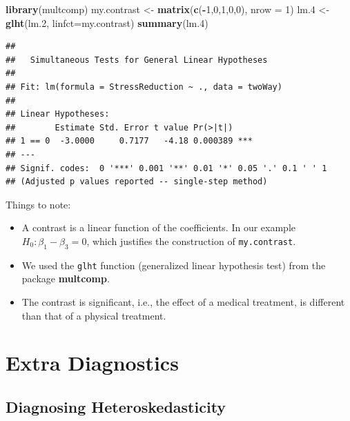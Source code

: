 \documentclass[]{book}
\newenvironment{Shaded}{\begin{snugshade}}{\end{snugshade}}
\newcommand{\KeywordTok}[1]{\textcolor[rgb]{0.13,0.29,0.53}{\textbf{#1}}}
\newcommand{\DataTypeTok}[1]{\textcolor[rgb]{0.13,0.29,0.53}{#1}}
\newcommand{\DecValTok}[1]{\textcolor[rgb]{0.00,0.00,0.81}{#1}}
\newcommand{\StringTok}[1]{\textcolor[rgb]{0.31,0.60,0.02}{#1}}
\newcommand{\OperatorTok}[1]{\textcolor[rgb]{0.81,0.36,0.00}{\textbf{#1}}}
\newcommand{\NormalTok}[1]{#1}
\providecommand{\tightlist}{%
  \setlength{\itemsep}{0pt}\setlength{\parskip}{0pt}}
\theoremstyle{definition}
\theoremstyle{definition}
\theoremstyle{definition}
\theoremstyle{remark}
\begin{document}
\begin{Shaded}
\begin{Highlighting}[]
\KeywordTok{library}\NormalTok{(multcomp)}
\NormalTok{my.contrast <-}\StringTok{ }\KeywordTok{matrix}\NormalTok{(}\KeywordTok{c}\NormalTok{(}\OperatorTok{-}\DecValTok{1}\NormalTok{,}\DecValTok{0}\NormalTok{,}\DecValTok{1}\NormalTok{,}\DecValTok{0}\NormalTok{,}\DecValTok{0}\NormalTok{), }\DataTypeTok{nrow =}  \DecValTok{1}\NormalTok{)}
\NormalTok{lm.}\DecValTok{4}\NormalTok{ <-}\StringTok{ }\KeywordTok{glht}\NormalTok{(lm.}\DecValTok{2}\NormalTok{, }\DataTypeTok{linfct=}\NormalTok{my.contrast)}
\KeywordTok{summary}\NormalTok{(lm.}\DecValTok{4}\NormalTok{)}
\end{Highlighting}
\end{Shaded}

\begin{verbatim}
## 
##   Simultaneous Tests for General Linear Hypotheses
## 
## Fit: lm(formula = StressReduction ~ ., data = twoWay)
## 
## Linear Hypotheses:
##        Estimate Std. Error t value Pr(>|t|)    
## 1 == 0  -3.0000     0.7177   -4.18 0.000389 ***
## ---
## Signif. codes:  0 '***' 0.001 '**' 0.01 '*' 0.05 '.' 0.1 ' ' 1
## (Adjusted p values reported -- single-step method)
\end{verbatim}

Things to note:

\begin{itemize}
\tightlist
\item
  A contrast is a linear function of the coefficients. In our example
  \(H_0:\beta_1-\beta_3=0\), which justifies the construction of
  \texttt{my.contrast}.
\item
  We used the \texttt{glht} function (generalized linear hypothesis
  test) from the package \textbf{multcomp}.
\item
  The contrast is significant, i.e., the effect of a medical treatment,
  is different than that of a physical treatment.
\end{itemize}

\section{Extra Diagnostics}\label{extra-diagnostics}

\subsection{Diagnosing
Heteroskedasticity}\label{diagnosing-heteroskedasticity}
\end{document}
